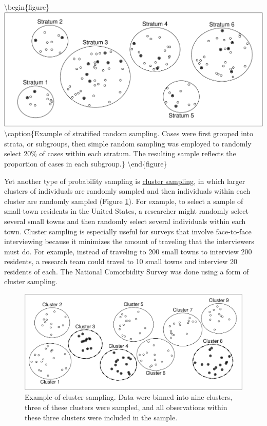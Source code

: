 \documentclass[
]{krantz}
\begin{document}
\textbackslash begin\{figure\}
\includegraphics[width=0.95\linewidth]{07-sampling_files/figure-latex/stratified-1} \textbackslash caption\{Example of stratified random sampling. Cases were first grouped into strata, or subgroups, then simple random sampling was employed to randomly select 20\% of cases within each stratum. The resulting sample reflects the proportion of cases in each subgroup.\}\label{fig:stratified}
\textbackslash end\{figure\}

Yet another type of probability sampling is \protect\hyperlink{cluster-sampling}{cluster sampling}, in which larger clusters of individuals are randomly sampled and then individuals within each cluster are randomly sampled (Figure \ref{fig:cluster}). For example, to select a sample of small-town residents in the United States, a researcher might randomly select several small towns and then randomly select several individuals within each town. Cluster sampling is especially useful for surveys that involve face-to-face interviewing because it minimizes the amount of traveling that the interviewers must do. For example, instead of traveling to 200 small towns to interview 200 residents, a research team could travel to 10 small towns and interview 20 residents of each. The National Comorbidity Survey was done using a form of cluster sampling.

\begin{figure}
\includegraphics[width=1\linewidth]{07-sampling_files/figure-latex/cluster-1} \caption{Example of cluster sampling. Data were binned into nine clusters, three of these clusters were sampled, and all observations within these three clusters were included in the sample.}\label{fig:cluster}
\end{figure}
\end{document}
